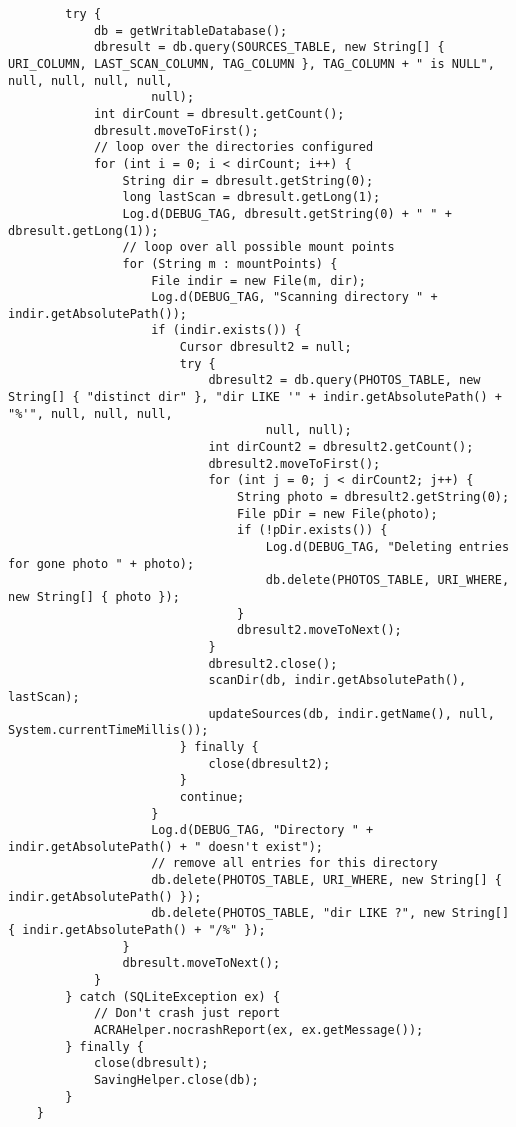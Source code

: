 \begin{enumerate}
\begin{verbatim}
        try {
            db = getWritableDatabase();
            dbresult = db.query(SOURCES_TABLE, new String[] { URI_COLUMN, LAST_SCAN_COLUMN, TAG_COLUMN }, TAG_COLUMN + " is NULL", null, null, null, null,
                    null);
            int dirCount = dbresult.getCount();
            dbresult.moveToFirst();
            // loop over the directories configured
            for (int i = 0; i < dirCount; i++) {
                String dir = dbresult.getString(0);
                long lastScan = dbresult.getLong(1);
                Log.d(DEBUG_TAG, dbresult.getString(0) + " " + dbresult.getLong(1));
                // loop over all possible mount points
                for (String m : mountPoints) {
                    File indir = new File(m, dir);
                    Log.d(DEBUG_TAG, "Scanning directory " + indir.getAbsolutePath());
                    if (indir.exists()) {
                        Cursor dbresult2 = null;
                        try {
                            dbresult2 = db.query(PHOTOS_TABLE, new String[] { "distinct dir" }, "dir LIKE '" + indir.getAbsolutePath() + "%'", null, null, null,
                                    null, null);
                            int dirCount2 = dbresult2.getCount();
                            dbresult2.moveToFirst();
                            for (int j = 0; j < dirCount2; j++) {
                                String photo = dbresult2.getString(0);
                                File pDir = new File(photo);
                                if (!pDir.exists()) {
                                    Log.d(DEBUG_TAG, "Deleting entries for gone photo " + photo);
                                    db.delete(PHOTOS_TABLE, URI_WHERE, new String[] { photo });
                                }
                                dbresult2.moveToNext();
                            }
                            dbresult2.close();
                            scanDir(db, indir.getAbsolutePath(), lastScan);
                            updateSources(db, indir.getName(), null, System.currentTimeMillis());
                        } finally {
                            close(dbresult2);
                        }
                        continue;
                    }
                    Log.d(DEBUG_TAG, "Directory " + indir.getAbsolutePath() + " doesn't exist");
                    // remove all entries for this directory
                    db.delete(PHOTOS_TABLE, URI_WHERE, new String[] { indir.getAbsolutePath() });
                    db.delete(PHOTOS_TABLE, "dir LIKE ?", new String[] { indir.getAbsolutePath() + "/%" });
                }
                dbresult.moveToNext();
            }
        } catch (SQLiteException ex) {
            // Don't crash just report
            ACRAHelper.nocrashReport(ex, ex.getMessage());
        } finally {
            close(dbresult);
            SavingHelper.close(db);
        }
    }
    \end{verbatim}



\end{enumerate}
